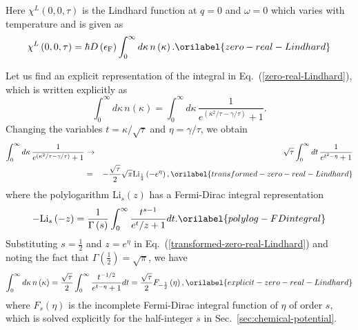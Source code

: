 \documentclass[aps,showkeys,noshowpacs,superscriptaddress,pre,preprint]{revtex4-2}
\let\label\orilabel
\begin{document}
Here $\chi^L \left( 0 , 0, \tau \right)$ is the Lindhard function at $q = 0$ and $\omega = 0$
which varies with temperature and is given as
\begin{equation}
\chi^L \left( 0 , 0, \tau \right)  = \hbar D\left( \epsilon_\mathrm{F} \right)
\int_0^\infty d\kappa \, n\left( \kappa \right) .
\label{zero-real-Lindhard}
\end{equation}

Let us find an explicit representation of the integral in Eq.~(\ref{zero-real-Lindhard}),
which is written explicitly as
\begin{equation*}
\int_0^\infty d\kappa \, n\left( \kappa \right) 
= \int_0^\infty d\kappa \, \frac{1}{e^{\left( \kappa^2 / \tau - \gamma / \tau \right)} + 1} .
\end{equation*}
Changing the variables $t = \kappa / \sqrt{\tau}$ and $\eta = \gamma / \tau$,
we obtain
\begin{eqnarray}
\int_0^\infty d\kappa \, \frac{1}{e^{\left( \kappa^2 / \tau - \gamma / \tau \right)} + 1} 
& \rightarrow &
\sqrt{\tau} \int_0^\infty dt \, \frac{1}{e^{t^2 - \eta} + 1} 
\nonumber \\
&=& - \frac{\sqrt{\tau}}{2} \sqrt{\pi} \mathrm{Li}_{\frac{1}{2}}\left( - e^{\eta} \right) ,
\label{transformed-zero-real-Lindhard}
\end{eqnarray}
where the polylogarithm $\mathrm{Li}_s \left( z \right)$ has a Fermi-Dirac integral representation
\begin{equation}
- \mathrm{Li}_{s} \left( - z \right) = 
\frac{1}{\Gamma\left( s \right) } \int_0^\infty \frac{t^{s-1}}{{e^t}/z + 1} dt .
\label{polylog-FDintegral}
\end{equation}
Substituting $s = \frac{1}{2}$ and $z = e^\eta$ in Eq.~(\ref{transformed-zero-real-Lindhard})
and noting the fact that $\Gamma\left( \frac{1}{2} \right) = \sqrt{\pi}$,
we have
\begin{equation}
\int_0^\infty d\kappa \, n\left( \kappa \right)
= \frac{\sqrt{\tau}}{2} \int_0^\infty \frac{t^{-1/2}}{e^{t - \eta} + 1} dt
= \frac{\sqrt{\tau}}{2} F_{-\frac{1}{2}}\left( \eta \right) ,
\label{explicit-zero-real-Lindhard}
\end{equation}
where $F_{s}\left( \eta \right)$ is the incomplete Fermi-Dirac integral function of $\eta$ of order $s$,
which is solved explicitly for the half-integer $s$ in Sec.~\ref{sec:chemical-potential}.
\end{document}
